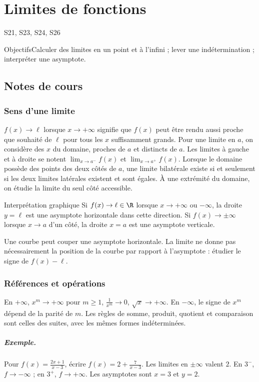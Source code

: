 \setcounter{chapter}{2}\chapter{Limites de fonctions}\label{ch:3}

{\small\sffamily\color{teal}S21, S23, S24, S26\par}

\begin{retenir}{Objectifs}Calculer des limites en un point et à l'infini ; lever une indétermination ; interpréter une asymptote.\end{retenir}

\section{Notes de cours}
\subsection{Sens d'une limite}
$f(x)\to\ell$ lorsque $x\to+\infty$ signifie que $f(x)$ peut être rendu aussi proche que souhaité de $\ell$ pour tous les $x$ suffisamment grands. Pour une limite en $a$, on considère des $x$ du domaine, proches de $a$ et distincts de $a$. Les limites à gauche et à droite se notent $\lim_{x\to a^-}f(x)$ et $\lim_{x\to a^+}f(x)$. Lorsque le domaine possède des points des deux côtés de $a$, une limite bilatérale existe si et seulement si les deux limites latérales existent et sont égales. À une extrémité du domaine, on étudie la limite du seul côté accessible.
\begin{retenir}{Interprétation graphique}
Si $f(x)\to\ell\in\R$ lorsque $x\to+\infty$ ou $-\infty$, la droite $y=\ell$ est une asymptote horizontale dans cette direction. Si $f(x)\to\pm\infty$ lorsque $x\to a$ d'un côté, la droite $x=a$ est une asymptote verticale.
\end{retenir}
Une courbe peut couper une asymptote horizontale. La limite ne donne pas nécessairement la position de la courbe par rapport à l'asymptote : étudier le signe de $f(x)-\ell$.
\subsection{Références et opérations}
En $+\infty$, $x^m\to+\infty$ pour $m\ge1$, $\frac{1}{x^m}\to0$, $\sqrt x\to+\infty$. En $-\infty$, le signe de $x^m$ dépend de la parité de $m$. Les règles de somme, produit, quotient et comparaison sont celles des suites, avec les mêmes formes indéterminées.
\paragraph{Exemple.} Pour $f(x)=\frac{2x+1}{x-3}$, écrire $f(x)=2+\frac{7}{x-3}$. Les limites en $\pm\infty$ valent $2$. En $3^-$, $f\to-\infty$ ; en $3^+$, $f\to+\infty$. Les asymptotes sont $x=3$ et $y=2$.
